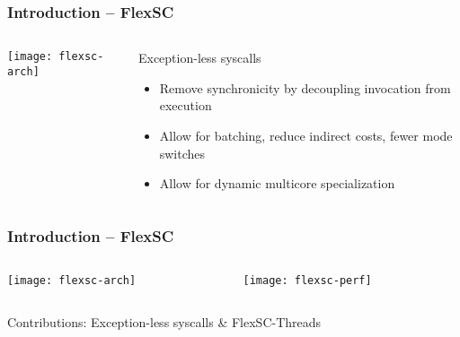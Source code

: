 \begin{frame}[plain]
	\frametitle{Introduction -- FlexSC}
	
	
	\begin{columns}
		
		\begin{column}{.4\textwidth}	
			
			\texttt{[image: flexsc-arch]}
			
		\end{column}
		
		\begin{column}{.6\textwidth}
			
			Exception-less syscalls
			\begin{itemize}
				\item  Remove synchronicity
				by decoupling invocation from execution
				
				
				\item Allow for batching, reduce indirect costs, fewer mode switches
				
				
				
				\item Allow for dynamic multicore specialization
				
				
				
			\end{itemize}
			
		\end{column}
		
	\end{columns}
	
	
\end{frame}	


\begin{frame}[plain]
	\frametitle{Introduction -- FlexSC}
	
	
	\begin{columns}
		
		\begin{column}{.4\textwidth}	
			
			\texttt{[image: flexsc-arch]}
			
		\end{column}
		
		\begin{column}{.6\textwidth}
			\texttt{[image: flexsc-perf]}


			
		\end{column}
		
	\end{columns}

			\LARGE Contributions: Exception-less syscalls  \& FlexSC-Threads	
	
\end{frame}	

